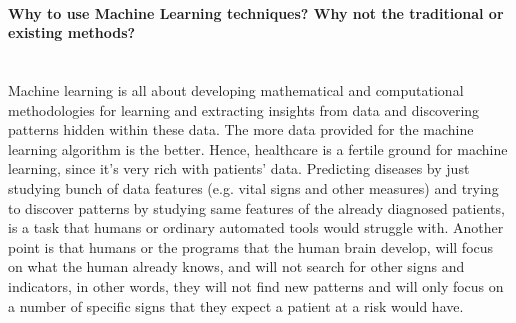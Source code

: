 \documentclass[11pt]{article}
\begin{document}
\paragraph{Why to use Machine Learning techniques? Why not the traditional or existing methods?} \mbox{}\\

Machine learning is all about developing mathematical and computational methodologies for learning and extracting insights from data and discovering patterns hidden within these data. 
The more data provided for the machine learning algorithm is the better. Hence, healthcare is a fertile ground for machine learning, since it’s very rich with patients’ data.
Predicting diseases by just studying bunch of data features (e.g. vital signs and other measures) and trying to discover patterns by studying same features of the already diagnosed patients, is a task that humans or ordinary automated tools would struggle with. Another point is that humans or the programs that the human brain develop, will focus on what the human already knows, and will not search for other signs and indicators, in other words, they will not find new patterns and will only focus on a number of specific signs that they expect a patient at a risk would have.  
\end{document}
